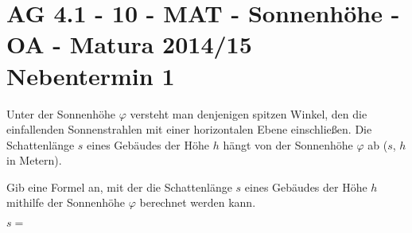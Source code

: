 \section{AG 4.1 - 10 - MAT - Sonnenhöhe - OA - Matura 2014/15 Nebentermin 1}

\begin{beispiel}[AG 4.1]{1} %
Unter der Sonnenhöhe $\varphi$ versteht man denjenigen spitzen Winkel, den die einfallenden Sonnenstrahlen mit einer horizontalen Ebene einschließen. Die Schattenlänge $s$ eines Gebäudes der Höhe $h$ hängt von der Sonnenhöhe $\varphi$ ab ($s$, $h$ in Metern). \leer

Gib eine Formel an, mit der die Schattenlänge $s$ eines Gebäudes der Höhe $h$ mithilfe der Sonnenhöhe $\varphi$ berechnet werden kann. \leer

$s=$ 
\end{beispiel}